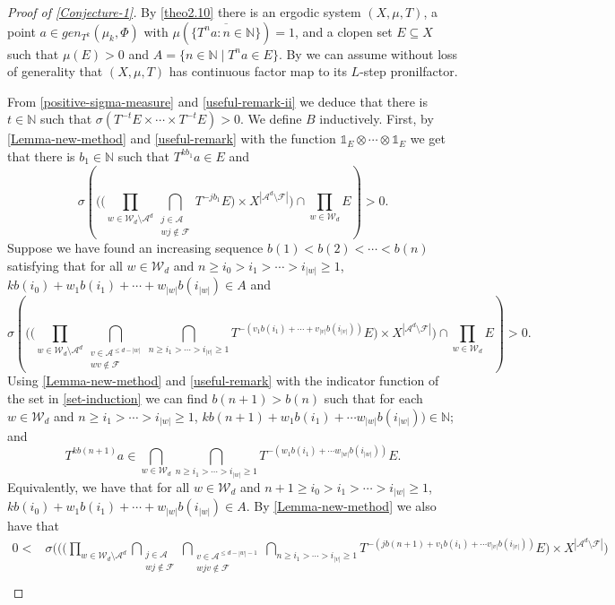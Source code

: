 \documentclass[letter,11pt]{article}
\theoremstyle{definition}
\newcommand{\N}{\mathbb{N}}
\newcommand{\sF}{\mathcal{F}}
\newcommand{\sA}{\mathcal{A}}
\newcommand{\ind}[1]{\mathbb{1}_{#1}}
\begin{document}
\begin{proof}[{Proof of \cref{Conjecture-1}}]
By \cref{theo2.10} there is an ergodic system $(X,\mu,T)$, a point $a\in gen_{T^k}(\mu_k,\Phi)$ with $\mu(\overline{\{T^na :n\in \N \}})=1$, and a clopen set $E\subseteq X$ such that $\mu(E) > 0$ and $A = \{n \in \N \mid T^n a \in  E\}$. By \cite[Proposition 5.7 and Lemma 5.8]{Kra_Moreira_Richter_Robertson:2022} we can assume without loss of generality that $(X,\mu,T)$ has continuous factor map to its $L$-step pronilfactor. 

From \cref{positive-sigma-measure} and \cref{useful-remark-ii} we deduce that there is $t\in \N$ such that $\sigma(T^{-t}E\times \cdots \times T^{-t}E)>0$. We define $B$ inductively. First, by \cref{Lemma-new-method} and \cref{useful-remark} with the function $\ind{E} \otimes\cdots \otimes \ind{E}$ we get that there is $b_1\in \N$ such that $T^{kb_1}a\in E$ and 
$$\sigma\left(\Bigg( \Big(\prod_{w\in \mathcal{W}_{d}\setminus\sA^d} \bigcap_{\substack{j\in \sA \\ wj\notin \sF}}T^{-jb_1} E \Big)\times X^{|\mathcal{A}^d\setminus \sF|} \Bigg)\cap \prod_{w\in \mathcal{W}_d} E  \right)>0.
$$
Suppose we have found an increasing sequence $b(1)<b(2)<\cdots <b(n)$ satisfying that for all $w\in \mathcal{W}_d$ and $n\geq i_0>i_1>\cdots >i_{|w|}\geq 1 $, $kb(i_0) + w_1 b(i_1)+\cdots + w_{|w|}b(i_{|w|}) \in A$ and 
\begin{equation}\label{set-induction}
\sigma\left(\Bigg( \Big(  \prod_{w\in \mathcal{W}_{d}\setminus\sA^d}  \bigcap_{\substack{v\in \mathcal{A}^{\leq d-|w|}\\ wv\notin \sF}}\bigcap_{n\geq i_{1}>\cdots >i_{|v|}\geq 1} T^{-(v_1b(i_{1})+\cdots +v_{|v|}b(i_{|v|}))}E \Big) \times X^{|\mathcal{A}^d\setminus\sF|}\Bigg)\cap  \prod_{w\in \mathcal{W}_d} E  \right)>0 .   
\end{equation}
Using \cref{Lemma-new-method} and \cref{useful-remark} with the indicator function of the set in \cref{set-induction} we can find $b(n+1)>b(n)$ such that for each $w\in \mathcal{W}_d$ and $n\geq i_{1}>\cdots >i_{|w|}\geq 1$, $kb(n+1)+w_1b(i_{1})+\cdots w_{|w|}b(i_{|w|}))\in \N$; and
$$T^{kb(n+1)}a\in \bigcap_{w\in \mathcal{W}_d}\bigcap_{n\geq i_{1}>\cdots >i_{|w|}\geq 1} T^{-(w_1b(i_{1})+\cdots w_{|w|}b(i_{|w|}))}E. $$
 Equivalently, we have  that for all $w\in \mathcal{W}_d$ and $n+1\geq i_0>i_1>\cdots >i_{|w|}\geq 1 $, $kb(i_0) + w_1 b(i_1)+\cdots + w_{|w|}b(i_{|w|}) \in A$. By \cref{Lemma-new-method} we also have that 
 \begin{align*}
     0<& \sigma\Bigg( \Big(\Big(  \prod_{w\in \mathcal{W}_{d}\setminus\sA^d}  \bigcap_{\substack{j\in \sA\\ wj\notin\sF}} \bigcap_{\substack{v\in \mathcal{A}^{\leq d-|w|-1}\\ wjv\notin \sF}}\bigcap_{n\geq i_{1}>\cdots >i_{|v|}\geq 1} T^{-(jb(n+1)+v_1b(i_{1})+\cdots v_{|v|}b(i_{|v|}))}E\Big)\times X^{|\mathcal{A}^d\setminus\sF|} \Big) \\

\end{align*}
\end{proof}
\end{document}
